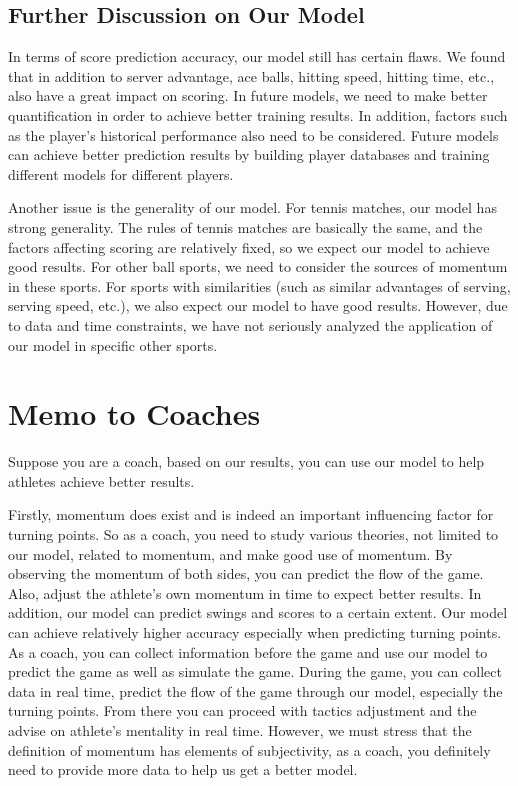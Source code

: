 \documentclass[UTF8]{mcmthesis}
\begin{document}
    
    
    \subsection{Further Discussion on Our Model}
    
    In terms of score prediction accuracy, our model still has certain flaws. We found that in addition to server advantage, ace balls, hitting speed, hitting time, etc., also have a great impact on scoring. In future models, we need to make better quantification in order to achieve better training results. In addition, factors such as the player's historical performance also need to be considered. Future models can achieve better prediction results by building player databases and training different models for different players.
    
    

    Another issue is the generality of our model. For tennis matches, our model has strong generality. The rules of tennis matches are basically the same, and the factors affecting scoring are relatively fixed, so we expect our model to achieve good results. For other ball sports, we need to consider the sources of momentum in these sports. For sports with similarities (such as similar advantages of serving, serving speed, etc.), we also expect our model to have good results. However, due to data and time constraints, we have not seriously analyzed the application of our model in specific other sports.
    
    
    
    

    \section{Memo to Coaches}
    
    Suppose you are a coach, based on our results, you can use our model to help athletes achieve better results.

    Firstly, momentum does exist and is indeed an important influencing factor for turning points. So as a coach, you need to study various theories, not limited to our model, related to momentum, and make good use of momentum. By observing the momentum of both sides, you can predict the flow of the game. Also, adjust the athlete's own momentum in time to expect better results. In addition, our model can predict swings and scores to a certain extent. Our model can achieve relatively higher accuracy especially when predicting turning points. As a coach, you can collect information before the game and use our model to predict the game as well as simulate the game. During the game, you can collect data in real time, predict the flow of the game through our model, especially the turning points. From there you can proceed with tactics adjustment and the advise on athlete's mentality in real time. However, we must stress that the definition of momentum has elements of subjectivity, as a coach, you definitely need to provide more data to help us get a better model.
    
\end{document}
